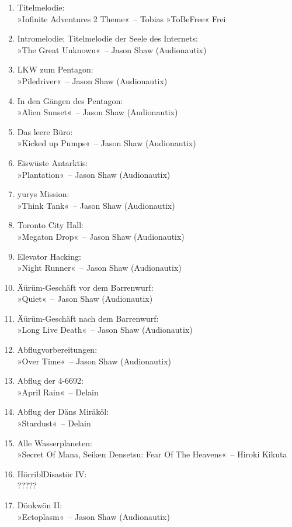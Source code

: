 \begin{enumerate}
    \item Titelmelodie:\\ »Infinite Adventures 2 Theme«~– Tobias »ToBeFree« Frei
    \item Intromelodie; Titelmelodie der Seele des Internets:\\ »The Great Unknown«~– Jason Shaw (Audionautix)
    \item LKW zum Pentagon:\\ »Piledriver«~– Jason Shaw (Audionautix)
    \item In den Gängen des Pentagon:\\ »Alien Sunset«~– Jason Shaw (Audionautix)
    \item Das leere Büro:\\ »Kicked up Pumps«~– Jason Shaw (Audionautix)
    \item Eiswüste Antarktis:\\ »Plantation«~– Jason Shaw (Audionautix)
    \item yurys Mission:\\ »Think Tank«~– Jason Shaw (Audionautix)
    \item Toronto City Hall:\\ »Megaton Drop«~– Jason Shaw (Audionautix)
    \item Elevator Hacking:\\ »Night Runner«~– Jason Shaw (Audionautix)
    \item Äürüm-Geschäft vor dem Barrenwurf:\\ »Quiet«~– Jason Shaw (Audionautix)
    \item Äürüm-Geschäft nach dem Barrenwurf:\\ »Long Live Death«~– Jason Shaw (Audionautix)
    \item Abflugvorbereitungen:\\ »Over Time«~– Jason Shaw (Audionautix)
    \item Abflug der 4-6692:\\ »April Rain«~– Delain
    \item Abflug der Däns Miräköl:\\ »Stardust«~– Delain
    \item Alle Wasserplaneten:\\ »Secret Of Mana, Seiken Densetsu: Fear Of The Heavens«~– Hiroki Kikuta
    \item HörriblDisastör IV:\\ ?????
    \item Dönkwön II:\\ »Ectoplasm«~– Jason Shaw (Audionautix)

\end{enumerate}
